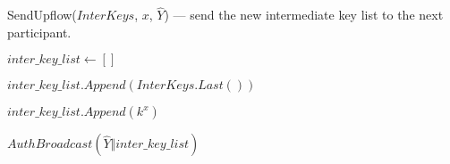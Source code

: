   \caption{SendUpflow($InterKeys$, $x$, $\hat{Y}$) --- send the new intermediate key list to the next participant.}
  \label{upflow_algo}
  \Begin
  {
    $inter\_key\_list \leftarrow []$

    $inter\_key\_list.Append(InterKeys.Last() )$

    {
      $inter\_key\_list.Append(k^x)$
    }

    $AuthBroadcast(\hat{Y} \Vert inter\_key\_list)$
  }
